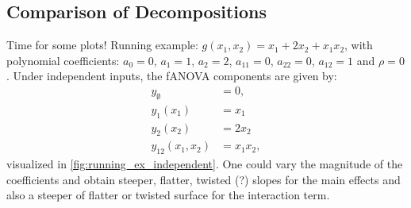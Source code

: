 
\subsection{Comparison of Decompositions}
Time for some plots!
Running example: $g(x_1, x_2) = x_1 + 2 x_2 + x_1 x_2$, with polynomial coefficients: $a_0 = 0$, $a_1 = 1$, $a_2 = 2$, $a_{11} = 0$, $a_{22} = 0$, $a_{12} = 1$ and $\rho = 0$.
Under independent inputs, the fANOVA components are given by:
\begin{align*}
y_{\emptyset} &= 0, \\
y_1(x_1) &= x_1\\
y_2(x_2) &= 2x_2\\
y_{12}(x_1, x_2) &= x_1x_2,
\end{align*}
visualized in \autoref{fig:running_ex_independent}. One could vary the magnitude of the coefficients and obtain steeper, flatter, twisted (?) slopes for the main effects and also a steeper of flatter or twisted surface for the interaction term.

